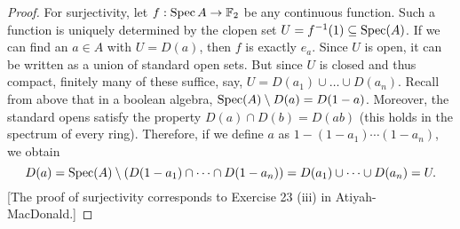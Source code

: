\documentclass{notes}
\begin{document}
{\begin{proof}
  For surjectivity, let \(f:\operatorname{Spec} A \to {\mathbb{F}}_2\) be any continuous function.
  Such a function is uniquely determined by the clopen set \(U=f^{-1}(1)\subseteq\operatorname{Spec}(A)\).
  If we can find an \(a\in A\) with \(U=D(a)\), then \(f\) is exactly \(e_a\).
  Since \(U\) is open, it can be written as a union of standard open sets.
  But since \(U\) is closed and thus compact, finitely many of these suffice, say, \(U=D(a_1)\cup\dots\cup D(a_n)\).
  Recall from above that in a boolean algebra, \(\operatorname{Spec}(A)\setminus D(a)=D(1-a)\).
  Moreover, the standard opens satisfy the property \(D(a)\cap D(b)=D(ab)\) (this holds in the spectrum of every ring).
  Therefore, if we define \(a\) as \(1-(1-a_1)\cdots (1-a_n)\), we obtain
  \[
    D(a) = \operatorname{Spec}(A)\setminus (D(1-a_1)\cap\dots\cap D(1-a_n)) = D(a_1)\cup\dots\cup D(a_n) = U.
  \]
  [The proof of surjectivity corresponds to Exercise 23 (iii) in Atiyah-MacDonald.]
\end{proof}
}
\end{document}
